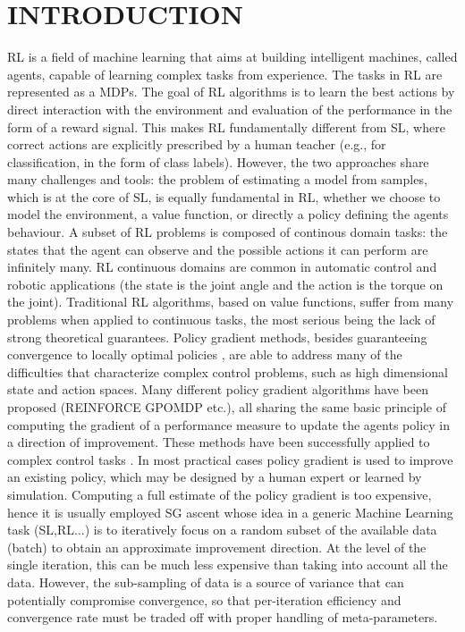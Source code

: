 
\chapter{INTRODUCTION} \label{chap:aChapter}

\acf{RL} is a field of machine learning that aims at building intelligent machines, called agents, capable of learning complex tasks from experience.
The tasks in \acs{RL} are represented as a \acf{MDP}s. 
The goal of \acs{RL} \citep{sutton1998reinforcement} algorithms is to learn the best actions by direct interaction with the environment and evaluation of the performance in the form of a reward signal.
This makes \acs{RL} fundamentally different from \acf{SL}, where correct actions are explicitly prescribed by a human teacher (e.g., for classification, in the form of class labels).
However, the two approaches share many challenges and tools: the problem of estimating a model from samples, which is at the core of \acs{SL}, is equally fundamental in \acs{RL}, whether we choose to model the environment, a value function, or directly a policy defining the agent\textquotesingle s behaviour.
A subset of \acs{RL} problems is composed of continous domain tasks: the states that the agent can observe and the possible actions it can perform are infinitely many.
\acs{RL} continuous domains are common in automatic control and robotic applications (\eg the state is the joint angle and the action is the torque on the joint). Traditional \acs{RL} algorithms, based on value functions, suffer from many problems when applied to continuous tasks, the most serious being the lack of strong theoretical guarantees. Policy gradient methods, besides guaranteeing convergence to locally optimal policies \citep{sutton2000policy}, are able to address many of the difficulties that characterize complex control problems, such as high dimensional state and action spaces. 
Many different policy gradient algorithms have been proposed (\eg REINFORCE \citep{williams1992simple} GPOMDP \citep{baxter2001infinite} etc.), all sharing the same basic principle of computing the gradient of a performance measure to update the agent\textquotesingle s policy in a direction of improvement. These methods have been successfully applied to complex control tasks \citep{deisenroth2013survey}. In most practical cases policy gradient is used to improve an existing policy, which may be designed by a human expert or learned by simulation.\newline
Computing a full estimate of the policy gradient is too expensive, hence it is usually employed \acf{SG} ascent \citep{nesterov2013introductory} whose idea in a generic Machine Learning task (\acs{SL},\acs{RL}...) is to iteratively focus on a random subset of the available data (batch) to obtain an approximate improvement direction. At the level of the single iteration, this can be much less expensive than taking into account all the data.
However, the sub-sampling of data is a source of variance that can potentially compromise convergence, so that per-iteration efficiency and convergence rate must be traded off with proper handling of meta-parameters. 
